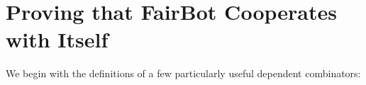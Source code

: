 \section{Proving that FairBot Cooperates with Itself} \label{sec:fair-bot-self-cooperates}


We begin with the definitions of a few particularly useful dependent
combinators:

\begin{code}%
\> \AgdaSymbol{:}  \AgdaSymbol{\{} \AgdaSymbol{:} \AgdaSymbol{\}}\<%
\\
\>[0]\<[2]%
\>[2]\AgdaSymbol{\{} \AgdaSymbol{:}   \AgdaSymbol{\}}\<%
\\
\>[0]\<[2]%
\>[2]\AgdaSymbol{\{} \AgdaSymbol{:} \AgdaSymbol{\{} \AgdaSymbol{:} \AgdaSymbol{\}}     \AgdaSymbol{\}}\<%
\\
\>[0]\<[2]%
\>[2] \AgdaSymbol{(\{} \AgdaSymbol{:} \AgdaSymbol{\}} \AgdaSymbol{(} \AgdaSymbol{:}  \AgdaSymbol{)}   \AgdaSymbol{)}\<%
\\
\>[0]\<[2]%
\>[2] \AgdaSymbol{(} \AgdaSymbol{:} \AgdaSymbol{(} \AgdaSymbol{:} \AgdaSymbol{)}   \AgdaSymbol{)} \AgdaSymbol{(} \AgdaSymbol{:} \AgdaSymbol{)}\<%
\\
\>[0]\<[2]%
\>[2]  \AgdaSymbol{(} \AgdaSymbol{)}\<%
\\
\>   \AgdaSymbol{=}     \AgdaSymbol{(} \AgdaSymbol{)}\<%
\\
%
\\
\>  \<%

\end{code}
